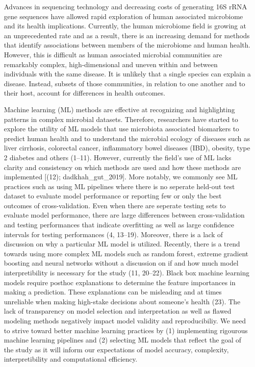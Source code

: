 \documentclass[11pt,]{article}
\begin{document}
Advances in sequencing technology and decreasing costs of generating 16S
rRNA gene sequences have allowed rapid exploration of human associated
microbiome and its health implications. Currently, the human microbiome
field is growing at an unprecedented rate and as a result, there is an
increasing demand for methods that identify associations between members
of the microbiome and human health. However, this is difficult as human
associated microbial communities are remarkably complex,
high-dimensional and uneven within and between individuals with the same
disease. It is unlikely that a single species can explain a disease.
Instead, subsets of those communities, in relation to one another and to
their host, account for differences in health outcomes.

Machine learning (ML) methods are effective at recognizing and
highlighting patterns in complex microbial datasets. Therefore,
researchers have started to explore the utility of ML models that use
microbiota associated biomarkers to predict human health and to
understand the microbial ecology of diseases such as liver cirrhosis,
colorectal cancer, inflammatory bowel diseases (IBD), obesity, type 2
diabetes and others (1--11). However, currently the field's use of ML
lacks clarity and consistency on which methods are used and how these
methods are implemented {[}(12); dadkhah\_gut\_2019{]}. More notably, we
commonly see ML practices such as using ML pipelines where there is no
seperate held-out test dataset to evaluate model performance or
reporting few or only the best outcomes of cross-validation. Even when
there are seperate testing sets to evaluate model performance, there are
large differences between cross-validation and testing performances that
indicate overfitting as well as large confidence intervals for testing
performances (4, 13--19). Moreover, there is a lack of discussion on why
a particular ML model is utilized. Recently, there is a trend towards
using more complex ML models such as random forest, extreme gradient
boosting and neural networks without a discussion on if and how much
model interpretibility is necessary for the study (11, 20--22). Black
box machine learning models require posthoc explanations to determine
the feature importances in making a prediction. These explanations can
be misleading and at times unreliable when making high-stake decisions
about someone's health (23). The lack of transparency on model selection
and interpretation as well as flawed modeling methods negatively impact
model validity and reproducibiliy. We need to strive toward better
machine learning practices by (1) implementing rigourous machine
learning pipelines and (2) selecting ML models that reflect the goal of
the study as it will inform our expectations of model accuracy,
complexity, interpretibility and computational efficiency.
\end{document}
